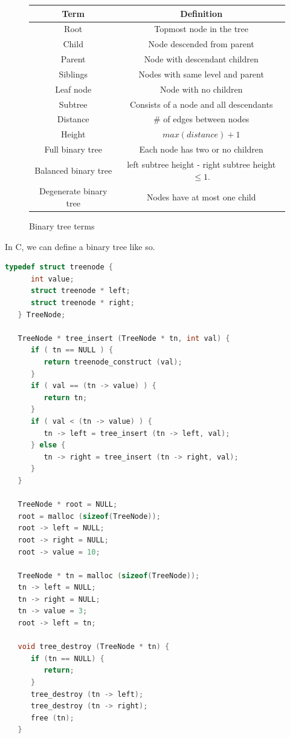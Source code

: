 \documentclass[nobib]{tufte-handout}
\begin{document}
\begin{figure}
   \caption{Binary tree terms}
   \label{table:bintree}
   \begin{tabular}{| c | c |}
      \hline 
      Term & Definition \\
      \hline 
      Root & Topmost node in the tree \\
      Child & Node descended from parent \\
      Parent & Node with descendant children  \\ 
      Siblings & Nodes with same level and parent \\
      Leaf node & Node with no children \\
      Subtree & Consists of a node and all descendants \\
      Distance & \# of edges between nodes \\ 
      Height & $max(distance) + 1$ \\
      Full binary tree & Each node has two or no children \\
      Balanced binary tree & left subtree height -
      right subtree height $\leq 1$. \\
      Degenerate binary tree & Nodes have at most one child \\
      \hline
   \end{tabular}
\end{figure}
\newpage
In C, we can define a binary tree like so. 
\begin{lstlisting}[language=C, caption=Binary tree]
   typedef struct treenode {
      int value;
      struct treenode * left;
      struct treenode * right;
   } TreeNode;

   TreeNode * tree_insert (TreeNode * tn, int val) {
      if ( tn == NULL ) {
         return treenode_construct (val);
      } 
      if ( val == (tn -> value) ) {
         return tn;
      } 
      if ( val < (tn -> value) ) {
         tn -> left = tree_insert (tn -> left, val);
      } else {
         tn -> right = tree_insert (tn -> right, val);
      }
   }

   TreeNode * root = NULL;
   root = malloc (sizeof(TreeNode));
   root -> left = NULL;
   root -> right = NULL;
   root -> value = 10;

   TreeNode * tn = malloc (sizeof(TreeNode));
   tn -> left = NULL;
   tn -> right = NULL;
   tn -> value = 3;
   root -> left = tn;

   void tree_destroy (TreeNode * tn) {
      if (tn == NULL) {
         return;
      }
      tree_destroy (tn -> left);
      tree_destroy (tn -> right);
      free (tn);
   }
\end{lstlisting}
\end{document}
